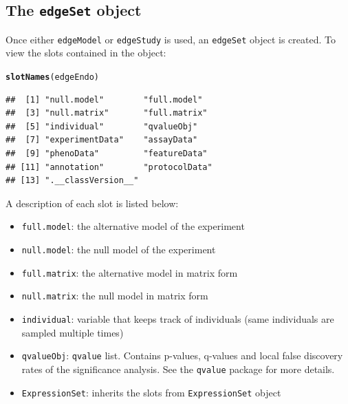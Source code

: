 \documentclass{article}\usepackage[]{graphicx}\usepackage[]{color}
\makeatletter
\newcommand{\hlstd}[1]{\textcolor[rgb]{0.345,0.345,0.345}{#1}}%
\newcommand{\hlkwd}[1]{\textcolor[rgb]{0.737,0.353,0.396}{\textbf{#1}}}%
\newenvironment{kframe}{%
 \def\at@end@of@kframe{}%
 \ifinner\ifhmode%
  \def\at@end@of@kframe{\end{minipage}}%
  \begin{minipage}{\columnwidth}%
 \fi\fi%
 \def\FrameCommand##1{\hskip\@totalleftmargin \hskip-\fboxsep
 \colorbox{shadecolor}{##1}\hskip-\fboxsep
     \hskip-\linewidth \hskip-\@totalleftmargin \hskip\columnwidth}%
 \MakeFramed {\advance\hsize-\width
   \@totalleftmargin\z@ \linewidth\hsize
   \@setminipage}}%
 {\par\unskip\endMakeFramed%
 \at@end@of@kframe}
\newenvironment{knitrout}{}{} %
\makeatother
\begin{document}
\subsection{The {\tt edgeSet} object}
Once either {\tt edgeModel} or {\tt edgeStudy} is used, an {\tt edgeSet} object is created. To view the slots contained in the object:
\begin{knitrout}
\color{fgcolor}\begin{kframe}
\begin{alltt}
\hlkwd{slotNames}\hlstd{(edgeEndo)}
\end{alltt}
\begin{verbatim}
##  [1] "null.model"        "full.model"       
##  [3] "null.matrix"       "full.matrix"      
##  [5] "individual"        "qvalueObj"        
##  [7] "experimentData"    "assayData"        
##  [9] "phenoData"         "featureData"      
## [11] "annotation"        "protocolData"     
## [13] ".__classVersion__"
\end{verbatim}
\end{kframe}
\end{knitrout}
A description of each slot is listed below: 
\begin{itemize}
\item {\tt full.model}: the alternative model of the experiment
\item {\tt null.model}: the null model of the experiment
\item {\tt full.matrix}: the alternative model in matrix form
\item {\tt null.matrix}: the null model in matrix form
\item {\tt individual}: variable that keeps track of individuals (same individuals are sampled multiple times)
\item {\tt qvalueObj}: {\tt qvalue} list. Contains p-values, q-values and local false discovery rates of the significance analysis. See the {\tt qvalue} package for more details.
\item {\tt ExpressionSet}: inherits the slots from {\tt ExpressionSet} object
\end{itemize}
\end{document}
